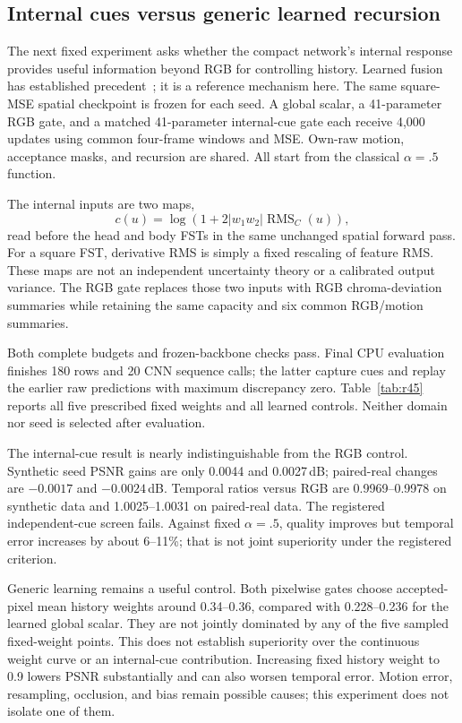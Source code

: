 \subsection{Internal cues versus generic learned recursion}
\label{sec:r45}

The next fixed experiment asks whether the compact network's internal
response provides useful information beyond RGB for controlling history.
Learned fusion has established precedent~\cite{emvd}; it is a reference
mechanism here. The same square-MSE spatial checkpoint is frozen for each
seed. A global scalar, a 41-parameter RGB gate, and a matched 41-parameter
internal-cue gate each receive 4,000 updates using common four-frame windows
and MSE. Own-raw motion, acceptance masks, and recursion are shared.
All start from the classical $\alpha=.5$ function.

The internal inputs are two maps,
\[
 c(u)=\log\!\left(1+2|w_1w_2|\operatorname{RMS}_{C}(u)\right),
\]
read before the head and body FSTs in the same unchanged spatial forward
pass. For a square FST, derivative RMS is simply a fixed rescaling of
feature RMS. These maps are not an independent uncertainty theory or a
calibrated output variance. The RGB gate replaces those two inputs with
RGB chroma-deviation summaries while retaining the same capacity and six
common RGB/motion summaries.

Both complete budgets and frozen-backbone checks pass. Final CPU evaluation
finishes 180 rows and 20 CNN sequence calls; the latter capture cues and
replay the earlier raw predictions with maximum discrepancy zero.
Table~\ref{tab:r45} reports all five prescribed fixed weights and all learned
controls. Neither domain nor seed is selected after evaluation.

The internal-cue result is nearly indistinguishable from the RGB control.
Synthetic seed PSNR gains are only 0.0044 and 0.0027\,dB; paired-real
changes are $-0.0017$ and $-0.0024$\,dB. Temporal ratios versus RGB are
0.9969--0.9978 on synthetic data and 1.0025--1.0031 on paired-real data.
The registered independent-cue screen fails. Against fixed $\alpha=.5$,
quality improves but temporal error increases by about 6--11\%; that is
not joint superiority under the registered criterion.

Generic learning remains a useful control. Both pixelwise gates choose
accepted-pixel mean history weights around 0.34--0.36, compared with
0.228--0.236 for the learned global scalar. They are not jointly dominated
by any of the five sampled fixed-weight points. This does not establish
superiority over the continuous weight curve or an internal-cue contribution.
Increasing fixed history weight to 0.9 lowers PSNR substantially and can
also worsen temporal error. Motion error, resampling, occlusion, and bias
remain possible causes; this experiment does not isolate one of them.

